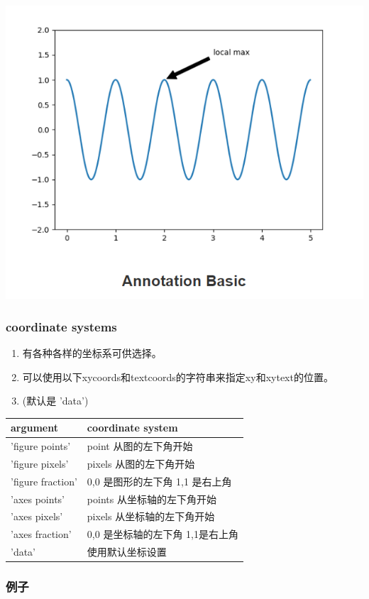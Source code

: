 \documentclass[UTF8,a4paper,12pt]{ctexart}  %
\providecommand{\tightlist}{\setlength{\itemsep}{0pt}\setlength{\parskip}{0pt}}
\begin{document}
\includegraphics{images/1581585591.png}

\hypertarget{coordinate-systems}{%
\subsubsection{coordinate systems}\label{coordinate-systems}}

\begin{enumerate}
\def\labelenumi{\arabic{enumi}.}
\tightlist
\item
  有各种各样的坐标系可供选择。
\item
  可以使用以下xycoords和textcoords的字符串来指定xy和xytext的位置。
\item
  (默认是 'data')
\end{enumerate}

\begin{longtable}[]{@{}ll@{}}
\toprule
argument & coordinate system\tabularnewline
\midrule
\endhead
'figure points' & point 从图的左下角开始\tabularnewline
'figure pixels' & pixels 从图的左下角开始\tabularnewline
'figure fraction' & 0,0 是图形的左下角 1,1 是右上角\tabularnewline
'axes points' & points 从坐标轴的左下角开始\tabularnewline
'axes pixels' & pixels 从坐标轴的左下角开始\tabularnewline
'axes fraction' & 0,0 是坐标轴的左下角 1,1是右上角\tabularnewline
'data' & 使用默认坐标设置\tabularnewline
\bottomrule
\end{longtable}

\hypertarget{ux4f8bux5b50-13}{%
\subsubsection{例子}\label{ux4f8bux5b50-13}}
\end{document}
